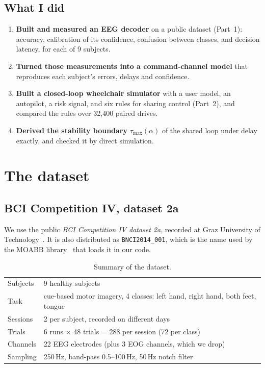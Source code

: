 \documentclass[11pt,a4paper]{article}
\newcommand{\code}[1]{\texttt{#1}}
\begin{document}
\subsection{What I did}
\begin{enumerate}\setlength{\itemsep}{1pt}
\item \textbf{Built and measured an EEG decoder} on a public dataset
(Part~1): accuracy, calibration of its confidence, confusion between
classes, and decision latency, for each of 9 subjects.
\item \textbf{Turned those measurements into a command-channel model}
that reproduces each subject's errors, delays and confidence.
\item \textbf{Built a closed-loop wheelchair simulator} with a user
model, an autopilot, a risk signal, and six rules for sharing control
(Part~2), and compared the rules over 32,400 paired drives.
\item \textbf{Derived the stability boundary} $\tau_{\max}(\alpha)$ of the
shared loop under delay exactly, and checked it by direct simulation.
\end{enumerate}

\section{The dataset}
\label{sec:data}

\subsection{BCI Competition IV, dataset 2a}
We use the public \emph{BCI Competition IV dataset 2a}, recorded at Graz
University of Technology~\cite{brunner2008graz,tangermann2012review}.
It is also distributed as \code{BNCI2014\_001}, which is the name used
by the MOABB library~\cite{jayaram2018moabb} that loads it in our code.

\begin{table}[H]
\centering\small
\begin{tabular}{@{}ll@{}}
\toprule
Subjects & 9 healthy subjects \\
Task & cue-based motor imagery, 4 classes: left hand, right hand, both feet, tongue \\
Sessions & 2 per subject, recorded on different days \\
Trials & 6 runs $\times$ 48 trials = 288 per session (72 per class) \\
Channels & 22 EEG electrodes (plus 3 EOG channels, which we drop) \\
Sampling & 250\,Hz, band-pass 0.5--100\,Hz, 50\,Hz notch filter \\
\bottomrule
\end{tabular}
\caption{Summary of the dataset.}
\label{tab:dataset}
\end{table}
\end{document}
